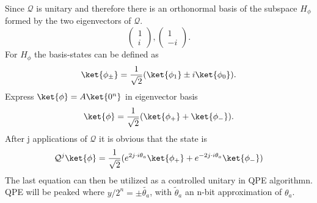 \documentclass[../../main.tex]{subfiles}
\begin{document}
Since $\mathcal{Q}$ is unitary and therefore there is an orthonormal basis of the subspace $H_{\phi}$ formed
by the two eigenvectors of $\mathcal{Q}$.
\begin{equation}\label{eq:eigenvectors}
  \begin{pmatrix}
    1\\
    i
  \end{pmatrix}
  ,
  \begin{pmatrix}
    1\\
    -i
  \end{pmatrix}.
\end{equation}
For $H_{\phi}$ the basis-states can be defined as
\begin{equation}\label{eq:HBasisStates}
  \ket{\phi_{\pm}} = \frac{1}{\sqrt{2}} (\ket{\phi_1} \pm i \ket{\phi_0}).
\end{equation} 
Express $\ket{\phi} = A \ket{0^n}$ in eigenvector basis 
\begin{equation}
  \ket{\phi} = \frac{1}{\sqrt{2}} ( \ket{\phi_+} + \ket{\phi_-}).
\end{equation}
After j applications of $\mathcal{Q}$ it is obvious that the state is
\begin{equation}\label{eq:PhiAfterJQ}
   \mathcal{Q}^j \ket{\phi} = \frac{1}{\sqrt{2}} ( e^{2j \cdot i \theta_a}\ket{\phi_+} + e^{-2j \cdot i \theta_a}\ket{\phi_-})
\end{equation}
The last equation can then be utilized as a controlled unitary in QPE algorithmn. QPE will be peaked where $y/2^n = \pm \tilde{\theta_a}$,
with $\tilde{\theta}_a$ an n-bit approximation of $\theta_a$.
\end{document}
